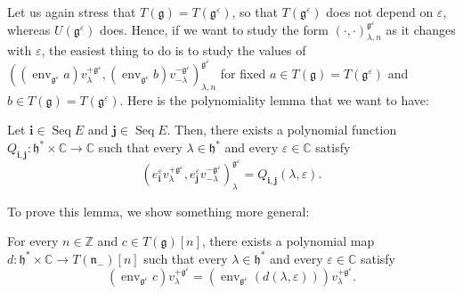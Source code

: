 \documentclass[etingof-lie.tex]{subfiles}
\begin{document}
Let us again stress that $T\left(  \mathfrak{g}\right)  =T\left(
\mathfrak{g}^{\varepsilon}\right)  $, so that $T\left(  \mathfrak{g}%
^{\varepsilon}\right)  $ does not depend on $\varepsilon$, whereas $U\left(
\mathfrak{g}^{\varepsilon}\right)  $ does. Hence, if we want to study the form
$\left(  \cdot,\cdot\right)  _{\lambda,n}^{\mathfrak{g}^{\varepsilon}}$ as it
changes with $\varepsilon$, the easiest thing to do is to study the values of
$\left(  \left(  \operatorname*{env}\nolimits_{\mathfrak{g}^{\varepsilon}%
}a\right)  v_{\lambda}^{+\mathfrak{g}^{\varepsilon}},\left(
\operatorname*{env}\nolimits_{\mathfrak{g}^{\varepsilon}}b\right)
v_{-\lambda}^{-\mathfrak{g}^{\varepsilon}}\right)  _{\lambda,n}^{\mathfrak{g}%
^{\varepsilon}}$ for fixed $a\in T\left(  \mathfrak{g}\right)  =T\left(
\mathfrak{g}^{\varepsilon}\right)  $ and $b\in T\left(  \mathfrak{g}\right)
=T\left(  \mathfrak{g}^{\varepsilon}\right)  $. Here is the polynomiality
lemma that we want to have:

\begin{lemma}
\label{lem.invformnondeg.polynomiality}Let $\mathbf{i}\in\operatorname*{Seq}E$
and $\mathbf{j}\in\operatorname*{Seq}E$. Then, there exists a polynomial
function $Q_{\mathbf{i},\mathbf{j}}:\mathfrak{h}^{\ast}\times\mathbb{C}%
\rightarrow\mathbb{C}$ such that every $\lambda\in\mathfrak{h}^{\ast}$ and
every $\varepsilon\in\mathbb{C}$ satisfy%
\[
\left(  e_{\mathbf{i}}^{\varepsilon}v_{\lambda}^{+\mathfrak{g}^{\varepsilon}%
},e_{\mathbf{j}}^{\varepsilon}v_{-\lambda}^{-\mathfrak{g}^{\varepsilon}%
}\right)  _{\lambda}^{\mathfrak{g}^{\varepsilon}}=Q_{\mathbf{i},\mathbf{j}%
}\left(  \lambda,\varepsilon\right)  .
\]

\end{lemma}

To prove this lemma, we show something more general:

\begin{lemma}
\label{lem.invformnondeg.polynomiality2}For every $n\in\mathbb{Z}$ and $c\in
T\left(  \mathfrak{g}\right)  \left[  n\right]  $, there exists a polynomial
map $d:\mathfrak{h}^{\ast}\times\mathbb{C}\rightarrow T\left(  \mathfrak{n}%
_{-}\right)  \left[  n\right]  $ such that every $\lambda\in\mathfrak{h}%
^{\ast}$ and every $\varepsilon\in\mathbb{C}$ satisfy%
\[
\left(  \operatorname*{env}\nolimits_{\mathfrak{g}^{\varepsilon}}c\right)
v_{\lambda}^{+\mathfrak{g}^{\varepsilon}}=\left(  \operatorname*{env}%
\nolimits_{\mathfrak{g}^{\varepsilon}}\left(  d\left(  \lambda,\varepsilon
\right)  \right)  \right)  v_{\lambda}^{+\mathfrak{g}^{\varepsilon}}.
\]

\end{lemma}
\end{document}
